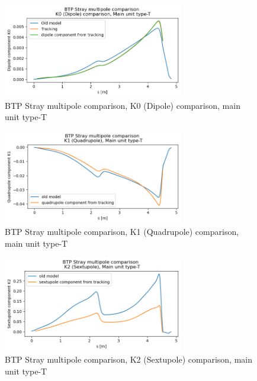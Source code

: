 \begin{figure}[H]
\centering
\includegraphics[width=0.7\textwidth]{02_Simulation/images/mcp_dipole.png}
\caption{BTP Stray multipole comparison, K0 (Dipole) comparison, main unit type-T}
\label{fig:mcp_dipole}
\end{figure}

\begin{figure}[H]
\centering
\includegraphics[width=0.7\textwidth]{02_Simulation/images/mcp_quadrupole.png}
\caption{BTP Stray multipole comparison, K1 (Quadrupole) comparison, main unit type-T}
\label{fig:mcp_quadrupole}
\end{figure}

\begin{figure}[H]
\centering
\includegraphics[width=0.7\textwidth]{02_Simulation/images/mcp_sextupole.png}
\caption{BTP Stray multipole comparison, K2 (Sextupole) comparison, main unit type-T}
\label{fig:mcp_sextupole}
\end{figure}

